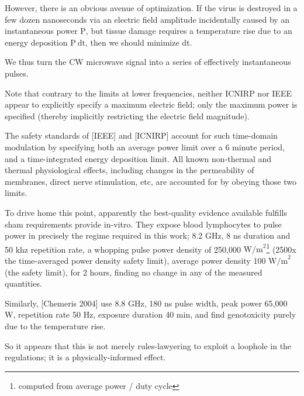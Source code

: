 \documentclass[fleqn,10pt]{article}
\begin{document}
However, there is an obvious avenue of optimization. If the virus is destroyed in a few dozen nanoseconds via an electric field amplitude incidentally caused by an instantaneous power $\text{P}$, but tissue damage requires a temperature rise due to an energy deposition $\text{P} \  \text{dt}$, then we should minimize dt.\

We thus turn the CW microwave signal into a series of effectively instantaneous pulses.

Note that contrary to the limits at lower frequencies, neither ICNIRP nor IEEE appear to explicitly specify a maximum electric field; only the maximum power is specified (thereby implicitly restricting the electric field magnitude).

The safety standards of [IEEE] and [ICNIRP] account for such time-domain modulation by specifying both an average power limit over a 6 minute period, and a time-integrated energy deposition limit. All known non-thermal and thermal physiological effects, including changes in the permeability of membranes, direct nerve stimulation, etc, are accounted for by obeying those two limits.

To drive home this point, apparently the best-quality evidence available fulfills sham requirements provide in-vitro. They expose blood lymphocytes to pulse power in precisely the regime required in this work; 8.2 GHz, 8 ns duration and 50 khz repetition rate, a whopping pulse power density of 250,000 $\text{W/m}^2$\footnote{computed from average power / duty cycle} (2500x the time-averaged power density safety limit), average power density 100 $\text{W/m}^2$ (the safety limit), for 2 hours, finding no change in any of the measured quantities. 

Similarly, [Chemeris 2004] use 8.8 GHz, 180 ns pulse width, peak power 65,000 W, repetition rate 50 Hz, exposure duration 40 min, and find genotoxicity purely due to the temperature rise.

So it appears that this is not merely rules-lawyering to exploit a loophole in the regulations; it is a physically-informed effect.
\end{document}

